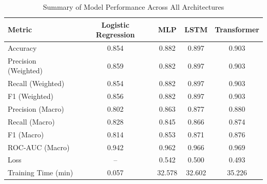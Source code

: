 \begin{table}[H]
\caption{Summary of Model Performance Across All Architectures}
\label{tab:summary_results}
\centering
\begin{tabular}{lcccc}
\toprule
Metric & Logistic Regression & MLP & LSTM & Transformer \\
\midrule
Accuracy & 0.854 & 0.882 & 0.897 & 0.903 \\
Precision (Weighted) & 0.859 & 0.882 & 0.897 & 0.903 \\
Recall (Weighted) & 0.854 & 0.882 & 0.897 & 0.903 \\
F1 (Weighted) & 0.856 & 0.882 & 0.897 & 0.903 \\
Precision (Macro) & 0.802 & 0.863 & 0.877 & 0.880 \\
Recall (Macro) & 0.828 & 0.845 & 0.866 & 0.874 \\
F1 (Macro) & 0.814 & 0.853 & 0.871 & 0.876 \\
ROC-AUC (Macro) & 0.942 & 0.962 & 0.966 & 0.969 \\
Loss & -- & 0.542 & 0.500 & 0.493 \\
Training Time (min) & 0.057 & 32.578 & 32.602 & 35.226 \\
\bottomrule
\end{tabular}
\end{table}
